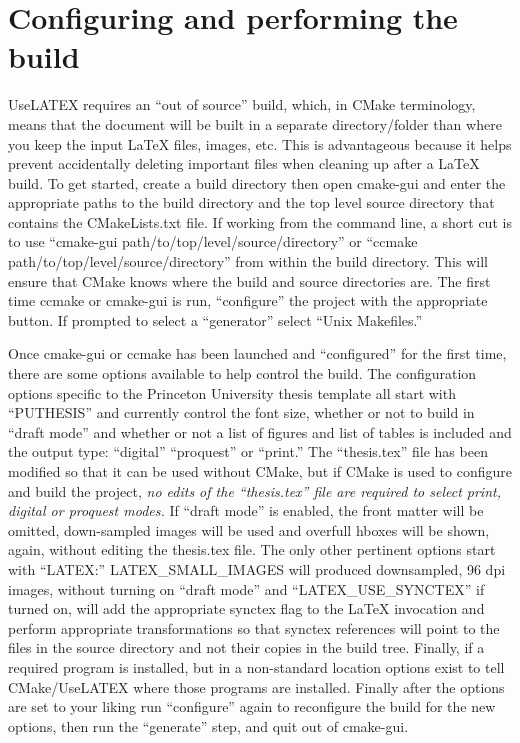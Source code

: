 \section{Configuring and performing the build}
\label{sec:building:configuring}

UseLATEX requires an ``out of source'' build, which, in CMake
terminology, means that the document will be built in a separate
directory/folder than where you keep the input \LaTeX{} files, images,
etc. This is advantageous because it helps prevent accidentally
deleting important files when cleaning up after a \LaTeX{} build. To get
started, create a build directory then open cmake-gui and enter the
appropriate paths to the build directory and the top level source
directory that contains the CMakeLists.txt file. If working from the
command line, a short cut is to use
``cmake-gui path/to/top/level/source/directory'' or
``ccmake path/to/top/level/source/directory'' from within the build
directory. This will ensure that CMake knows where the build and
source directories are. The first time ccmake or cmake-gui is run,
``configure'' the project with the appropriate button. If prompted to
select a ``generator'' select ``Unix Makefiles.''

Once cmake-gui or ccmake has been launched and ``configured'' for the
first time, there are some options available to help control the
build. The configuration options specific to the Princeton University
thesis template all start with ``PUTHESIS'' and currently control the
font size, whether or not to build in ``draft mode'' and whether or not a
list of figures and list of tables is included and the output type:
``digital'' ``proquest'' or ``print.'' The ``thesis.tex'' file has
been modified so that it can be used without CMake, but if CMake is
used to configure and build the project, \emph{no edits of the
  ``thesis.tex'' file are required to select print, digital or
  proquest modes.} If ``draft mode'' is enabled, the front matter will
be omitted, down-sampled images will be used and overfull hboxes will
be shown, again, without editing the thesis.tex file. The only other
pertinent options start with ``LATEX:'' LATEX\_SMALL\_IMAGES will
produced downsampled, 96 dpi images, without turning on ``draft mode''
and ``LATEX\_USE\_SYNCTEX'' if turned on, will add the appropriate
synctex flag to the \LaTeX{} invocation and perform appropriate
transformations so that synctex references will point to the files in
the source directory and not their copies in the build tree. Finally,
if a required program is installed, but in a non-standard location
options exist to tell CMake/UseLATEX where those programs are
installed. Finally after the options are set to your liking run
``configure'' again to reconfigure the build for the new options, then
run the ``generate'' step, and quit out of cmake-gui.

